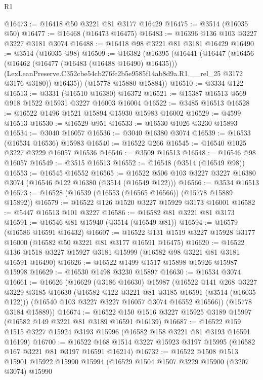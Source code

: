 \begin{lexlean}{R1}
\begin{coremodule}
@16473 := @16418 @50 @3221 @81 @3177 @16429
@16475 := @3514 (@16035 @50)
@16477 := @16468 (@16473 @16475)
@16483 := @16396 @136 @103 @3227 @3227 @3181 @3074
@16488 := @16418 @98 @3221 @81 @3181 @16429
@16490 := @3514 (@16035 @98)
@16509 := @16382
    (@16395
      (@16441
        (@16447
          (@16456
            (@16462 (@16477 (@16483 (@16488 @16490) @16435)))
            (LexLeanPreserve.C352cbe54cb276fc2b5e9585f14ab8d9a.R1.__rel_25 @3172 @3176 @3180))
          @16435))
      (@15778 @15880 @15884))
@16510 := @3334 @122
@16513 := @3331 (@16510 @16380) @16372
@16521 := @15387 @16513 @569 @918 @1522 @15931 @3227 @16003 @16004
@16522 := @3485 @16513
@16528 := @16522 @1496 @1521 @15894 @15930 @15983 @16002
@16529 := @4599 @16513
@16530 := @16529 @951
@16533 := @16530 @1026 @3230 @15893
@16534 := @3040 @16057
@16536 := @3040 @16380 @3074
@16539 := @16533 (@16534 @16536) @15983
@16540 := @16522 @266
@16545 := @16540 @1025 @3227 @3229 @16057 @16536
@16546 := @3509 @16513
@16548 := @16546 @98 @16057
@16549 := @3515 @16513
@16552 := @16548 (@3514 (@16549 @98))
@16553 := @16545 @16552
@16565 := @16522 @506 @103 @3227 @3227 @16380 @3074 (@16546 @122 @16380 (@3514 (@16549 @122)))
@16566 := @3534 @16513
@16573 := @16528 (@16539 (@16553 (@16565 @16566)) (@15778 @15889 @15892))
@16579 := @16522 @126 @1520 @3227 @15929 @3173 @16001
@16582 := @5447 @16513 @101 @3227
@16586 := @16582 @81 @3221 @81 @3173
@16591 := @16546 @81 @15940 (@3514 (@16549 @81))
@16594 := @16579 (@16586 @16591 @16432)
@16607 := @16522 @131 @1519 @3227 @15928 @3177 @16000 (@16582 @50 @3221 @81 @3177 @16591 @16475)
@16620 := @16522 @136 @1518 @3227 @15927 @3181 @15999 (@16582 @98 @3221 @81 @3181 @16591 @16490)
@16626 := @16522 @1499 @1517 @15898 @15926 @15987 @15998
@16629 := @16530 @1498 @3230 @15897
@16630 := @16534 @3074
@16661 := @16626
    (@16629
      (@3186 @16630)
      @15987
      (@16522
        @141
        @268
        @3227
        @3229
        @3185
        @16630
        (@16582 @122 @3221 @81 @3185 @16591 (@3514 (@16035 @122)))
        (@16540 @103 @3227 @3227 @16057 @3074 @16552 @16566))
      (@15778 @3184 @15889))
@16674 := @16522 @150 @1516 @3227 @15925 @3189 @15997 (@16582 @149 @3221 @81 @3189 @16591 @16139)
@16687 := @16522 @159 @1515 @3227 @15924 @3193 @15996 (@16582 @158 @3221 @81 @3193 @16591 @16199)
@16700 := @16522 @168 @1514 @3227 @15923 @3197 @15995 (@16582 @167 @3221 @81 @3197 @16591 @16214)
@16732 := @16522
    @1508
    @1513
    @15901
    @15922
    @15990
    @15994
    (@16529
      @1504
      @1507
      @3229
      @15900
      (@3207 @3074)
      @15990

\end{coremodule}
\end{lexlean}
